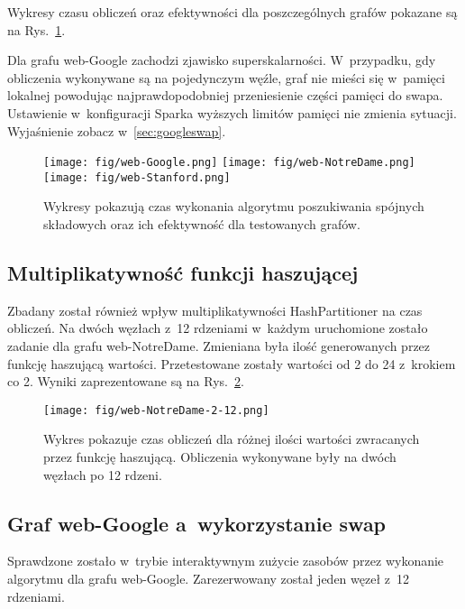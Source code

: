 \documentclass[a4paper; 12pt]{article}
\begin{document}
Wykresy czasu obliczeń oraz efektywności dla poszczególnych grafów pokazane są
na Rys.~\ref{fig:web-graphs}.

Dla grafu web-Google zachodzi zjawisko superskalarności.
W~przypadku, gdy obliczenia wykonywane są na pojedynczym węźle, graf nie mieści
się w~pamięci lokalnej powodując najprawdopodobniej przeniesienie części
pamięci do swapa.
Ustawienie w~konfiguracji Sparka wyższych limitów pamięci nie zmienia sytuacji.
Wyjaśnienie zobacz w~\ref{sec:googleswap}.

\begin{figure}
    \centering
    \texttt{[image: fig/web-Google.png]}
    \texttt{[image: fig/web-NotreDame.png]}
    \texttt{[image: fig/web-Stanford.png]}
    \caption{Wykresy pokazują czas wykonania algorytmu poszukiwania spójnych
        składowych oraz ich efektywność dla testowanych grafów.}
    \label{fig:web-graphs}
\end{figure}

\subsection{Multiplikatywność funkcji haszującej}

Zbadany został również wpływ multiplikatywności HashPartitioner na czas obliczeń.
Na dwóch węzłach z~12 rdzeniami w~każdym uruchomione zostało zadanie dla
grafu web-NotreDame.
Zmieniana była ilość generowanych przez funkcję haszującą wartości.
Przetestowane zostały wartości od 2 do 24 z~krokiem co 2.
Wyniki zaprezentowane są na Rys.~\ref{fig:multiplicity}.

\begin{figure}
    \centering
    \texttt{[image: fig/web-NotreDame-2-12.png]}
    \caption{Wykres pokazuje czas obliczeń dla różnej ilości wartości
        zwracanych przez funkcję haszującą.
        Obliczenia wykonywane były na dwóch węzłach po 12 rdzeni.}
    \label{fig:multiplicity}
\end{figure}

\subsection{Graf web-Google a~wykorzystanie swap \label{sec:googleswap}}

Sprawdzone zostało w~trybie interaktywnym zużycie zasobów przez wykonanie
algorytmu dla grafu web-Google.
Zarezerwowany został jeden węzeł z~12 rdzeniami.
\end{document}
